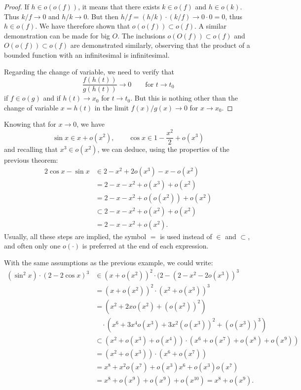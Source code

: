 \begin{proof}
If $h\in o(o(f))$, it means that there exists $k\in o(f)$ and $h\in o(k)$. Thus
$k/f\to 0$ and $h/k\to 0$. But then $h/f = (h/k)\cdot (k/f) \to 0\cdot 0 = 0$,
thus $h \in o(f)$. We have therefore shown that $o(o(f)) \subset o(f)$. A
similar demonstration can be made for big $O$. The inclusions $o(O(f))\subset
o(f)$ and $O(o(f))\subset o(f)$ are demonstrated similarly, observing that the
product of a bounded function with an infinitesimal is infinitesimal.

Regarding the change of variable, we need to verify that
\[
  \frac{f(h(t))}{g(h(t))} \to 0
  \qquad\text{for $t\to t_0$}
\]
if $f\in o(g)$ and if $h(t)\to x_0$ for $t \to t_0$. But this is nothing other
than the change of variable $x=h(t)$ in the limit $f(x)/g(x)\to 0$ for $x\to
x_0$.
\end{proof}

\begin{example}
Knowing that for $x\to 0$, we have
\[
\sin x \in x + o(x^2), \qquad \cos x \in 1 - \frac {x^2}{2} + o(x^3)
\]
and recalling that $x^3 \in o (x^2)$, we can deduce, using the properties of the
previous theorem:
\begin{align*}
2\cos x  - \sin x
&\in 2 - x^2 + 2o(x^3) - x - o(x^2)\\
&= 2- x - x^2 + o(x^3) + o(x^2)\\
&= 2- x - x^2 + o(o(x^2)) + o(x^2)\\
 &\subset 2 - x - x^2 + o(x^2) + o(x^2)\\
 &= 2-x-x^2 + o(x^2).
\end{align*}
Usually, all these steps are implied, the symbol $=$ is used instead of $\in$
and $\subset$, and often only one $o(\cdot)$ is preferred at the end of each
expression.
\end{example}

\begin{example}
With the same assumptions as the previous example, we could write:
\begin{align*}
(\sin^2 x)\cdot(2-2\cos x)^3
&\in (x+o(x^2))^2 \cdot (2 - (2- x^2 - 2o(x^3))^3 \\
&= (x+o(x^2))^2 \cdot (x^2+o(x^3))^3 \\
&= (x^2 + 2 x o(x^2) + (o(x^2))^2) \\
&\quad \cdot (x^6 + 3 x^4 o(x^3) + 3 x^2(o(x^3))^2 + (o(x^3))^3)\\
&\subset (x^2 + o(x^3) + o(x^4))\cdot(x^6 + o(x^7) + o(x^8) + o(x^9)) \\
&= (x^2 + o(x^3)) \cdot(x^6+o(x^7)) \\
&= x^8 + x^2o(x^7) + o(x^3) x^6 + o(x^3)o(x^7)\\
&= x^8 + o(x^9) + o(x^9) + o(x^{10})
= x^8 + o(x^9).
\end{align*}
\end{example}

